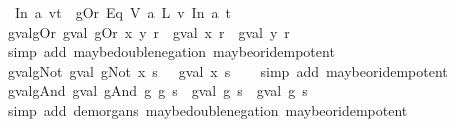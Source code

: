 \begin{isabellebody}
\ \ {\isachardoublequoteopen}In\ a\ {\isacharparenleft}v{}{\isacharhash}t{\isacharparenright}\ {\isacharequal}\ gOr\ {\isacharparenleft}Eq\ {\isacharparenleft}V\ a{\isacharparenright}\ {\isacharparenleft}L\ v{}{\isacharparenright}{\isacharparenright}\ {\isacharparenleft}In\ a\ t{\isacharparenright}{\isachardoublequoteclose}\isanewline
\isanewline
{}\isamarkupfalse%
\ gval{\isacharunderscore}gOr{\isacharcolon}\ {\isachardoublequoteopen}gval\ {\isacharparenleft}gOr\ x\ y{\isacharparenright}\ r\ {\isacharequal}\ {\isacharparenleft}gval\ x\ r{\isacharparenright}\ {\isasymor}\isactrlsub {\isacharquery}\ {\isacharparenleft}gval\ y\ r{\isacharparenright}{\isachardoublequoteclose}\isanewline
%
\isadelimproof
\ \ %
\endisadelimproof
%
\isatagproof
{}\isamarkupfalse%
\ {\isacharparenleft}simp\ add{\isacharcolon}\ maybe{\isacharunderscore}double{\isacharunderscore}negation\ maybe{\isacharunderscore}or{\isacharunderscore}idempotent{\isacharparenright}%
\endisatagproof
{\isafoldproof}%
%
\isadelimproof
\isanewline
%
\endisadelimproof
\isanewline
{}\isamarkupfalse%
\ gval{\isacharunderscore}gNot{\isacharcolon}\ {\isachardoublequoteopen}gval\ {\isacharparenleft}gNot\ x{\isacharparenright}\ s\ {\isacharequal}\ {\isasymnot}\isactrlsub {\isacharquery}\ {\isacharparenleft}gval\ x\ s{\isacharparenright}{\isachardoublequoteclose}\isanewline
%
\isadelimproof
\ \ %
\endisadelimproof
%
\isatagproof
{}\isamarkupfalse%
\ {\isacharparenleft}simp\ add{\isacharcolon}\ maybe{\isacharunderscore}or{\isacharunderscore}idempotent{\isacharparenright}%
\endisatagproof
{\isafoldproof}%
%
\isadelimproof
\isanewline
%
\endisadelimproof
\isanewline
{}\isamarkupfalse%
\ gval{\isacharunderscore}gAnd{\isacharcolon}\ {\isachardoublequoteopen}gval\ {\isacharparenleft}gAnd\ g{}\ g{}{\isacharparenright}\ s\ {\isacharequal}\ {\isacharparenleft}gval\ g{}\ s{\isacharparenright}\ {\isasymand}\isactrlsub {\isacharquery}\ {\isacharparenleft}gval\ g{}\ s{\isacharparenright}{\isachardoublequoteclose}\isanewline
%
\isadelimproof
\ \ %
\endisadelimproof
%
\isatagproof
{}\isamarkupfalse%
\ {\isacharparenleft}simp\ add{\isacharcolon}\ de{\isacharunderscore}morgans{\isacharunderscore}{}\ maybe{\isacharunderscore}double{\isacharunderscore}negation\ maybe{\isacharunderscore}or{\isacharunderscore}idempotent{\isacharparenright}%
\endisatagproof
{\isafoldproof}%
%
\isadelimproof
\isanewline
%
\endisadelimproof
\isanewline
{}\isamarkupfalse%

\end{isabellebody}
